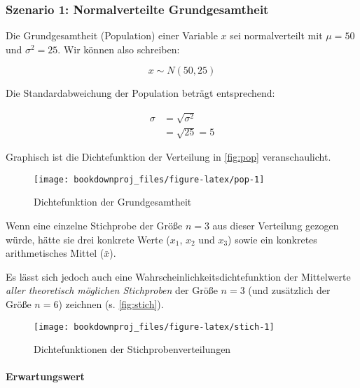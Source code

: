 \documentclass[
  ngerman,
]{article}
\begin{document}
\hypertarget{szenario-1-normalverteilte-grundgesamtheit}{%
\subsubsection{Szenario 1: Normalverteilte Grundgesamtheit}\label{szenario-1-normalverteilte-grundgesamtheit}}

Die Grundgesamtheit (Population) einer Variable \(x\) sei normalverteilt mit \(\mu=50\) und \(\sigma^2=25\). Wir können also schreiben:

\nopagebreak

\[ x \sim N(50,25) \]

Die Standardabweichung der Population beträgt entsprechend:

\nopagebreak

\[\begin{aligned}
\sigma&=\sqrt{\sigma^2}\\[4pt]
&=\sqrt{25}=5\end{aligned}\]

Graphisch ist die Dichtefunktion der Verteilung in \autoref{fig:pop} veranschaulicht.

\begin{figure}[h]

{\centering \texttt{[image: bookdownproj\_files/figure-latex/pop-1]} 

}

\caption{Dichtefunktion der Grundgesamtheit}\label{fig:pop}
\end{figure}

Wenn eine einzelne Stichprobe der Größe \(n=3\) aus dieser Verteilung gezogen würde, hätte sie drei konkrete Werte (\(x_1\), \(x_2\) und \(x_3\)) sowie ein konkretes arithmetisches Mittel (\(\bar{x}\)).

Es lässt sich jedoch auch eine Wahrscheinlichkeitsdichtefunktion der Mittelwerte \emph{aller theoretisch möglichen Stichproben} der Größe \(n=3\) (und zusätzlich der Größe \(n=6\)) zeichnen (s. \autoref{fig:stich}).

\begin{figure}[h]

{\centering \texttt{[image: bookdownproj\_files/figure-latex/stich-1]} 

}

\caption{Dichtefunktionen der Stichprobenverteilungen}\label{fig:stich}
\end{figure}

\hypertarget{erwartungswert}{%
\paragraph{Erwartungswert}\label{erwartungswert}}
\end{document}
